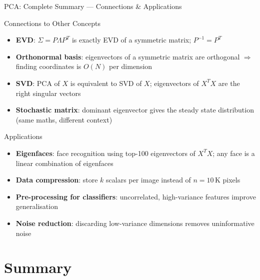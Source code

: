 \documentclass{beamer}
\begin{document}
\begin{frame}[shrink=10]{PCA: Complete Summary --- Connections \& Applications}
  \begin{block}{Connections to Other Concepts}
    \begin{itemize}\setlength\itemsep{6pt}
      \item \textbf{EVD}: $\Sigma = P\Lambda P^T$ is exactly EVD of a
            symmetric matrix; $P^{-1} = P^T$
      \item \textbf{Orthonormal basis}: eigenvectors of a symmetric
            matrix are orthogonal $\Rightarrow$ finding coordinates is
            $O(N)$ per dimension
      \item \textbf{SVD}: PCA of $X$ is equivalent to SVD of $X$;
            eigenvectors of $X^TX$ are the right singular vectors
      \item \textbf{Stochastic matrix}: dominant eigenvector gives
            the steady state distribution (same maths, different context)
    \end{itemize}
  \end{block}

  \medskip

  \begin{block}{Applications}
    \begin{itemize}\setlength\itemsep{5pt}
      \item \textbf{Eigenfaces}: face recognition using top-100
            eigenvectors of $X^TX$; any face is a linear combination
            of eigenfaces
      \item \textbf{Data compression}: store $k$ scalars per image
            instead of $n=10\,\text{K}$ pixels
      \item \textbf{Pre-processing for classifiers}: uncorrelated,
            high-variance features improve generalisation
      \item \textbf{Noise reduction}: discarding low-variance dimensions
            removes uninformative noise
    \end{itemize}
  \end{block}
\end{frame}

\section{Summary}
\end{document}
